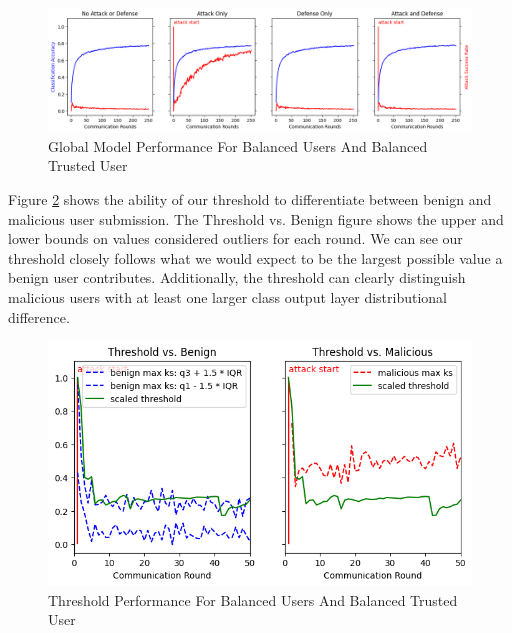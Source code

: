 \documentclass{article} %
\begin{document}
\begin{figure}[H]
    \centering
    \includegraphics[width=\textwidth]{01_trusted/centralized/alpha10000--alpha_val10000/visuals/accuracy--n_malicious1--m_start1.png}
    \caption{Global Model Performance For Balanced Users And Balanced Trusted User}
    \label{fig:centralized--alpha10000--alpha_val10000--accuracy--n_malicious1--m_start1}
\end{figure}

Figure \ref{fig:centralized--alpha10000--alpha_val10000--threshold--n_malicious1--m_start1--d_rounds50} shows the ability of our threshold to differentiate between benign and malicious user submission. The Threshold vs. Benign figure shows the upper and lower bounds on values considered outliers for each round. We can see our threshold closely follows what we would expect to be the largest possible value a benign user contributes. Additionally, the threshold can clearly distinguish malicious users with at least one larger class output layer distributional difference. 

\begin{figure}[H]
    \centering
    \includegraphics[width=.75\textwidth]{01_trusted/centralized/alpha10000--alpha_val10000/visuals/threshold--n_malicious1--m_start1--d_rounds50.png}
    \caption{Threshold Performance For Balanced Users And Balanced Trusted User}
    \label{fig:centralized--alpha10000--alpha_val10000--threshold--n_malicious1--m_start1--d_rounds50}
\end{figure}
\end{document}
